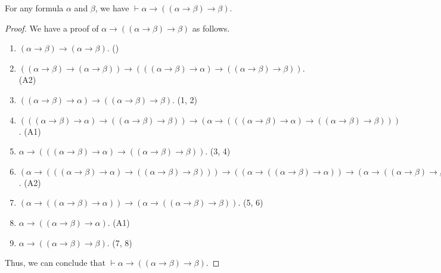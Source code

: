 \begin{theorem}
  \label{thm:modus-ponens}
  For any formula $\alpha$ and $\beta$, we have
  $\vdash \alpha \to ((\alpha \to \beta) \to \beta)$.
\end{theorem}
\begin{proof}
  We have a proof of $\alpha \to ((\alpha \to \beta) \to \beta)$ as follows.
  \begin{enumerate}[(1)]
    \item $(\alpha \to \beta) \to (\alpha \to \beta)$.
    \hfill ()
    \item $((\alpha \to \beta) \to (\alpha \to \beta)) \to
    (((\alpha \to \beta) \to \alpha) \to ((\alpha \to \beta) \to \beta))$.
    \hfill (A2)
    \item $((\alpha \to \beta) \to \alpha) \to ((\alpha \to \beta) \to \beta)$.
    \hfill (1, 2)
    \item $(((\alpha \to \beta) \to \alpha) \to ((\alpha \to \beta) \to \beta))
    \to (\alpha \to (((\alpha \to \beta) \to \alpha) \to ((\alpha \to \beta)
    \to \beta)))$. \hfill (A1)
    \item $\alpha \to (((\alpha \to \beta) \to \alpha) \to ((\alpha \to \beta)
    \to \beta))$. \hfill (3, 4)
    \item $(\alpha \to (((\alpha \to \beta) \to \alpha) \to ((\alpha \to \beta)
    \to \beta))) \to ((\alpha \to ((\alpha \to \beta) \to \alpha)) \to (\alpha
    \to ((\alpha \to \beta) \to \beta)))$. \hfill (A2)
    \item $(\alpha \to ((\alpha \to \beta) \to \alpha)) \to (\alpha \to
    ((\alpha \to \beta) \to \beta))$. \hfill (5, 6)
    \item $\alpha \to ((\alpha \to \beta) \to \alpha)$. \hfill (A1)
    \item $\alpha \to ((\alpha \to \beta) \to \beta)$. \hfill (7, 8)
  \end{enumerate}
  Thus, we can conclude that
  $\vdash \alpha \to ((\alpha \to \beta) \to \beta)$.
\end{proof}


